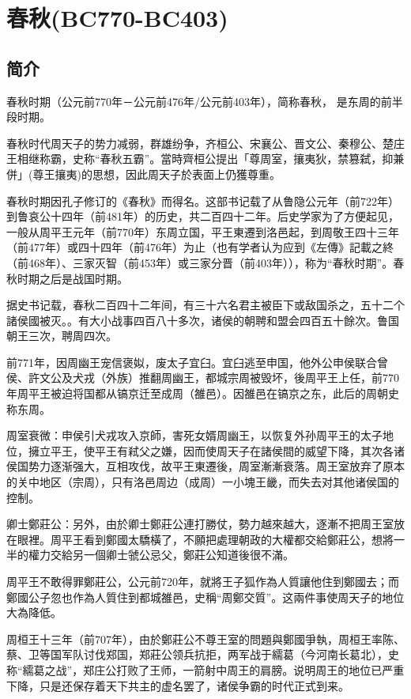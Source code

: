 
\chapter{春秋{\tiny(BC770-BC403)}}

\section{简介}

春秋时期（公元前770年－公元前476年/公元前403年），简称春秋， 是东周的前半段时期。

春秋时代周天子的势力减弱，群雄纷争，齐桓公、宋襄公、晋文公、秦穆公、楚庄王相继称霸，史称“春秋五霸”。當時齊桓公提出「尊周室，攘夷狄，禁篡弑，抑兼併」(尊王攘夷)的思想，因此周天子於表面上仍獲尊重。

春秋时期因孔子修订的《春秋》而得名。这部书记载了从鲁隐公元年（前722年）到鲁哀公十四年（前481年）的历史，共二百四十二年。后史学家为了方便起见，一般从周平王元年（前770年）东周立国，平王東遷到洛邑起，到周敬王四十三年（前477年）或四十四年（前476年）为止（也有学者认为应到《左傳》記載之終（前468年）、三家灭智（前453年）或三家分晋（前403年）），称为“春秋时期”。春秋时期之后是战国时期。

据史书记载，春秋二百四十二年间，有三十六名君主被臣下或敌国杀之，五十二个諸侯國被灭。。有大小战事四百八十多次，诸侯的朝聘和盟会四百五十餘次。鲁国朝王三次，聘周四次。

前771年，因周幽王宠信褒姒，废太子宜臼。宜臼逃至申国，他外公申侯联合曾侯、許文公及犬戎（外族）推翻周幽王，都城宗周被毁坏，後周平王上任，前770年周平王被迫将国都从镐京迁至成周（雒邑）。因雒邑在镐京之东，此后的周朝史称东周。

周室衰微：申侯引犬戎攻入京師，害死女婿周幽王，以恢复外孙周平王的太子地位，擁立平王，使平王有弒父之嫌，因而使周天子在諸侯間的威望下降，其次各诸侯国势力逐渐强大，互相攻伐，故平王東遷後，周室漸漸衰落。周王室放弃了原本的关中地区（宗周），只有洛邑周边（成周）一小塊王畿，而失去对其他诸侯国的控制。

卿士鄭莊公：另外，由於卿士鄭莊公連打勝仗，勢力越來越大，逐漸不把周王室放在眼裡。周平王看到鄭國太驕橫了，不願把處理朝政的大權都交給鄭莊公，想將一半的權力交給另一個卿士虢公忌父，鄭莊公知道後很不滿。

周平王不敢得罪鄭莊公，公元前720年，就將王子狐作為人質讓他住到鄭國去；而鄭國公子忽也作為人質住到都城雒邑，史稱“周鄭交質”。这兩件事使周天子的地位大為降低。

周桓王十三年（前707年），由於鄭莊公不尊王室的問題與鄭國爭執，周桓王率陈、蔡、卫等国军队讨伐郑国，郑莊公领兵抗拒，两军战于繻葛（今河南长葛北），史称“繻葛之战”，郑庄公打败了王师，一箭射中周王的肩膀。说明周王的地位已严重下降，只是还保存着天下共主的虚名罢了，诸侯争霸的时代正式到来。

